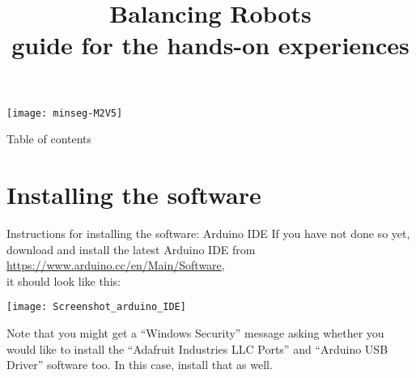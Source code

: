\newif	\ifexternalize					%
\newif	\ifshowonlynotes				%
\newif	\ifhandout						%
\newif	\ifshowsolutions				%
\newif	\ifshownotes					%
\ifdefined\EXTERNALIZE	\externalizetrue	\fi						%
\ifdefined\ONLYNOTES	\showonlynotestrue	\fi						%
\ifdefined\HANDOUT		\handouttrue		\fi						%
\ifdefined\SOLUTIONS	\showsolutionstrue	\fi						%
\ifdefined\NOTES		\shownotestrue		\fi						%
\title		[Balancing Robots]	{Balancing Robots \\ guide for the hands-on experiences}
\date		{} %


\begin{frame}
	\titlepage
	\vspace{-1.9cm} 
	\begin{center}
		\texttt{[image: minseg-M2V5]}
	\end{center}
\end{frame}


\begin{frame}{Table of contents}
	\tableofcontents
\end{frame}


\section{Installing the software}


\begin{frame}[t]{Instructions for installing the software: Arduino IDE}
	If you have not done so yet, download and install the latest Arduino IDE from \url{https://www.arduino.cc/en/Main/Software}, \\ it should look like this:
	\begin{center}
		\texttt{[image: Screenshot\_arduino\_IDE]}
	\end{center}
	Note that you might get a ``Windows Security'' message asking whether you would like to install the ``Adafruit Industries LLC Ports'' and ``Arduino USB Driver'' software too. In this case, install that as well.
\end{frame}


